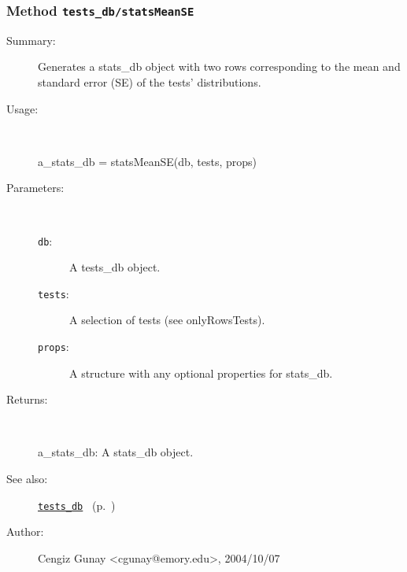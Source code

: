 \subsubsection[Method \texttt{statsMeanSE}]{Method \texttt{tests\_db/statsMeanSE}}%
%
\label{ref_tests_db__statsMeanSE}%
\hypertarget{ref_tests_db__statsMeanSE}{}%
\begin{description}
\item[Summary:]Generates a stats\_db object with two rows corresponding to 
		the mean and standard error (SE) of the tests' distributions.
%
\item[Usage:]~%
\begin{lyxcode}%
a\_stats\_db = statsMeanSE(db, tests, props)
%
\end{lyxcode}%
%
%
\item[Parameters:]~
\begin{description}%
\item[\texttt{db}:]
 A tests\_db object.
\item[\texttt{tests}:]
 A selection of tests (see onlyRowsTests).
\item[\texttt{props}:]
 A structure with any optional properties for stats\_db.
\end{description}%
%
\item[Returns:]~

	a\_stats\_db: A stats\_db object.
%
%
\item[See also:]%
\hyperlink{ref_tests_db}{\texttt{tests\_db}}%
\ (p.~\pageref{ref_tests_db})%
%
%
\item[Author:]%
Cengiz Gunay <cgunay@emory.edu>, 2004/10/07%
\end{description}
\methodline%
